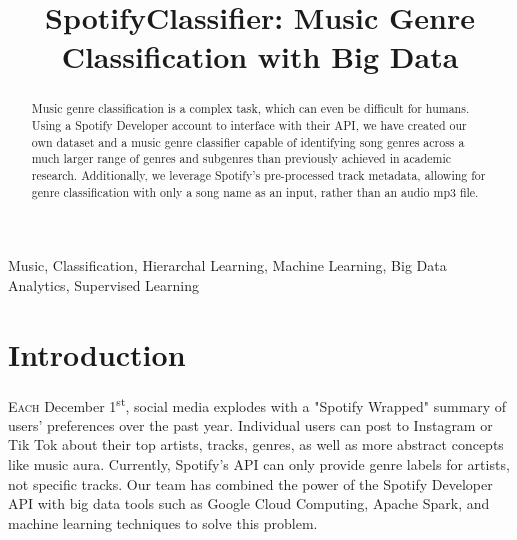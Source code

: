 \documentclass[conference]{IEEEtran}
\begin{document}
\title{SpotifyClassifier: Music Genre Classification with Big Data\\
}

\author{
\and
{}
\and
{}
}

\maketitle
\begin{abstract}
Music genre classification is a complex task, which can even be difficult for humans. Using a Spotify Developer account to interface with their API, we have created our own dataset and a music genre classifier capable of identifying song genres across a much larger range of genres and subgenres than previously achieved in academic research. Additionally, we leverage Spotify's pre-processed track metadata, allowing for genre classification with only a song name as an input, rather than an audio mp3 file.
\end{abstract}

\begin{IEEEkeywords}
Music, Classification, Hierarchal Learning, Machine Learning, Big Data Analytics, Supervised Learning
\end{IEEEkeywords}

\section{Introduction}
\lettrine{E}{ach} December 1\textsuperscript{st}, social media explodes with a "Spotify Wrapped" summary of users' preferences over the past year. Individual users can post to Instagram or Tik Tok about their top artists, tracks, genres, as well as more abstract concepts like music aura. Currently, Spotify's API can only provide genre labels for artists, not specific tracks. Our team has combined the power of the Spotify Developer API with big data tools such as Google Cloud Computing, Apache Spark, and machine learning techniques to solve this problem. 
\end{document}
